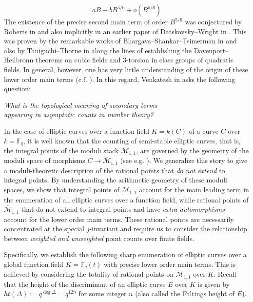 \documentclass[a4paper,12pt]{amsart}
\theoremstyle{definition}
\newcommand{\Me}{\overline{\mathcal{M}}_{1,1}}
\newcommand{\Fb}{\mathbb{F}}
\begin{document}
	\vspace{-.13in}
	\begin{equation*}\label{eq:cubic-fields}
		aB - bB^{5/6} + o(B^{5/6})
	\end{equation*}
	The existence of the precise second main term of order $B^{5/6}$ was conjectured by Roberts in \cite{Roberts} and also implicitly in an earlier paper of Datskovsky--Wright in \cite{DW}. This was proven by the remarkable works of Bhargava--Shankar--Tsimerman in \cite{BST} and also by Taniguchi--Thorne in \cite{TT} along the lines of establishing the Davenport–Heilbronn theorems \cite{DH, DH2} on cubic fields and 3-torsion in class groups of quadratic fields. In general, however, one has very little understanding of the origin of these lower order main terms (c.f.  \cite[\S 2.6]{VE}). In this regard, Venkatesh in \cite[Prob. 5]{GGW} asks the following question:
	
	\begin{center}
		\textit{What is the topological meaning of secondary terms \\ appearing in asymptotic counts in number theory?}
	\end{center}
	
	In the case of elliptic curves over a function field $K=k(C)$ of a curve $C$ over $k=\Fb_q$, it is well known that the counting of semi-stable elliptic curves, that is, the integral points of the moduli stack $\Me$, are governed by the geometry of the moduli space of morphisms $C \to \Me$ (see e.g. \cite{HP, BPS}). We generalize this story to give a moduli-theoretic description of the rational points that \textit{do not extend} to integral points. By understanding the arithmetic geometry of these moduli spaces, we show that integral points of $\Me$ account for the main leading term in the enumeration of all elliptic curves over a function field, while rational points of $\Me$ that do not extend to integral points and have \textit{extra automorphisms} account for the lower order main terms. These rational points are necessarily concentrated at the special $j$-invariant and require us to consider the relationship between \textit{weighted and unweighted} point counts over finite fields.
	
	\medskip
	
	Specifically, we establish the following sharp enumeration of elliptic curves over a global function field $K = \Fb_q(t)$ with precise lower order main terms. This is achieved by considering the totality of rational points on $\Me$ over $K$. Recall that the height of the discriminant of an elliptic curve $E$ over $K$ is given by $ht(\Delta):=q^{\deg \Delta} = q^{12n}$ for some integer $n$ (also called the Faltings height of $E$).
	
\end{document}
